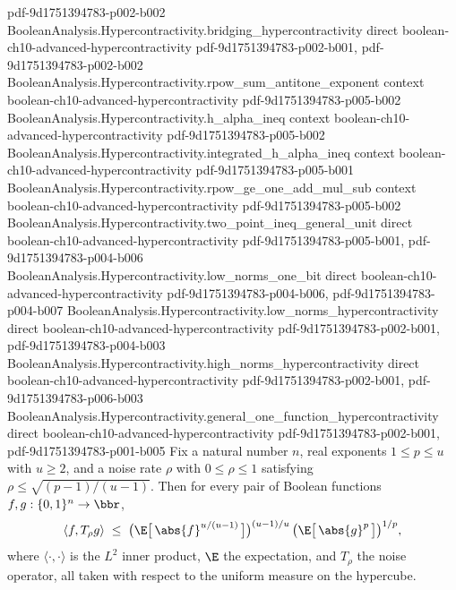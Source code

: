 \begin{theorem}
  {pdf-9d1751394783-p002-b002}
\proofstep
  {BooleanAnalysis.Hypercontractivity.bridging_hypercontractivity}
  {direct}
  {boolean-ch10-advanced-hypercontractivity}
  {pdf-9d1751394783-p002-b001,
    pdf-9d1751394783-p002-b002}
\proofstep
  {BooleanAnalysis.Hypercontractivity.rpow_sum_antitone_exponent}
  {context}
  {boolean-ch10-advanced-hypercontractivity}
  {pdf-9d1751394783-p005-b002}
\proofstep
  {BooleanAnalysis.Hypercontractivity.h_alpha_ineq}
  {context}
  {boolean-ch10-advanced-hypercontractivity}
  {pdf-9d1751394783-p005-b002}
\proofstep
  {BooleanAnalysis.Hypercontractivity.integrated_h_alpha_ineq}
  {context}
  {boolean-ch10-advanced-hypercontractivity}
  {pdf-9d1751394783-p005-b001}
\proofstep
  {BooleanAnalysis.Hypercontractivity.rpow_ge_one_add_mul_sub}
  {context}
  {boolean-ch10-advanced-hypercontractivity}
  {pdf-9d1751394783-p005-b002}
\proofstep
  {BooleanAnalysis.Hypercontractivity.two_point_ineq_general_unit}
  {direct}
  {boolean-ch10-advanced-hypercontractivity}
  {pdf-9d1751394783-p005-b001,
    pdf-9d1751394783-p004-b006}
\proofstep
  {BooleanAnalysis.Hypercontractivity.low_norms_one_bit}
  {direct}
  {boolean-ch10-advanced-hypercontractivity}
  {pdf-9d1751394783-p004-b006,
    pdf-9d1751394783-p004-b007}
\proofstep
  {BooleanAnalysis.Hypercontractivity.low_norms_hypercontractivity}
  {direct}
  {boolean-ch10-advanced-hypercontractivity}
  {pdf-9d1751394783-p002-b001,
    pdf-9d1751394783-p004-b003}
\proofstep
  {BooleanAnalysis.Hypercontractivity.high_norms_hypercontractivity}
  {direct}
  {boolean-ch10-advanced-hypercontractivity}
  {pdf-9d1751394783-p002-b001,
    pdf-9d1751394783-p006-b003}
\proofstep
  {BooleanAnalysis.Hypercontractivity.general_one_function_hypercontractivity}
  {direct}
  {boolean-ch10-advanced-hypercontractivity}
  {pdf-9d1751394783-p002-b001,
    pdf-9d1751394783-p001-b005}
Fix a natural number $n$, real exponents $1 \le p \le u$ with $u \ge 2$, and a noise rate $\rho$ with $0 \le
\rho \le 1$ satisfying $\rho \le \sqrt{(p-1)/(u-1)}$. Then for every pair of Boolean
functions $f, g : \{0,1\}^n \to \bbr$,
\[
  \langle f, T_\rho g\rangle
  \;\le\;
  \bigl(\E\bigl[\,\abs{f}^{u/(u-1)}\,\bigr]\bigr)^{(u-1)/u}\,
  \bigl(\E\bigl[\,\abs{g}^{p}\,\bigr]\bigr)^{1/p},
\]
where $\langle\cdot,\cdot\rangle$ is the $L^2$ inner product, $\E$ the expectation, and
$T_\rho$ the noise operator, all taken with respect to the uniform measure on the
hypercube.
\end{theorem}
